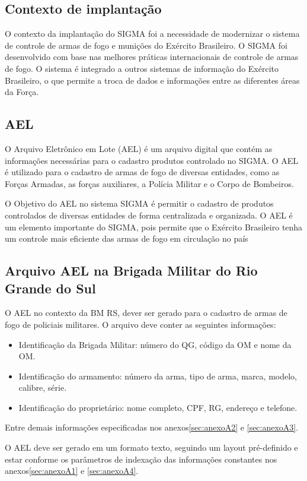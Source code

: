 \subsection{Contexto de implantação}
O contexto da implantação do SIGMA foi a necessidade de modernizar o sistema de controle de armas de fogo e munições do Exército Brasileiro.
O SIGMA foi desenvolvido com base nas melhores práticas internacionais de controle de armas de fogo. O sistema é integrado a outros sistemas de informação do Exército Brasileiro, o que permite a troca de dados e informações entre as diferentes áreas da Força.\cite{fenemeReunixE3oSobre}

\subsection{AEL}
O Arquivo Eletrônico em Lote (AEL) é um arquivo digital que contém as informações necessárias para o cadastro produtos controlado no SIGMA.
O AEL é utilizado para o cadastro de armas de fogo de diversas entidades, como as Forças Armadas, as forças auxiliares, a Polícia Militar e o Corpo de Bombeiros.\cite{ExércitoBrasileiro}

O Objetivo do AEL no sistema SIGMA é permitir o cadastro de produtos controlados de diversas entidades de forma centralizada e organizada. O AEL é um elemento importante do SIGMA, pois permite que o Exército Brasileiro tenha um controle mais eficiente das armas de fogo em circulação no país\cite{ExércitoBrasileiro}

\subsection{Arquivo AEL na Brigada Militar do Rio Grande do Sul}
O AEL no contexto da BM RS, dever ser gerado para o cadastro de armas de fogo de policiais militares. O arquivo deve conter as seguintes informações:
\begin{itemize}
    \item Identificação da Brigada Militar: número do QG, código da OM e nome da OM.
    \item Identificação do armamento: número da arma, tipo de arma, marca, modelo, calibre, série.
    \item Identificação do proprietário: nome completo, CPF, RG, endereço e telefone.
\end{itemize}
Entre demais informações especificadas nos anexos\ref{sec:anexoA2} e \ref{sec:anexoA3}.

O AEL deve ser gerado em um formato texto, seguindo um layout pré-definido e estar conforme os parâmetros de indexação das informações constantes nos anexos\ref{sec:anexoA1} e \ref{sec:anexoA4}.

